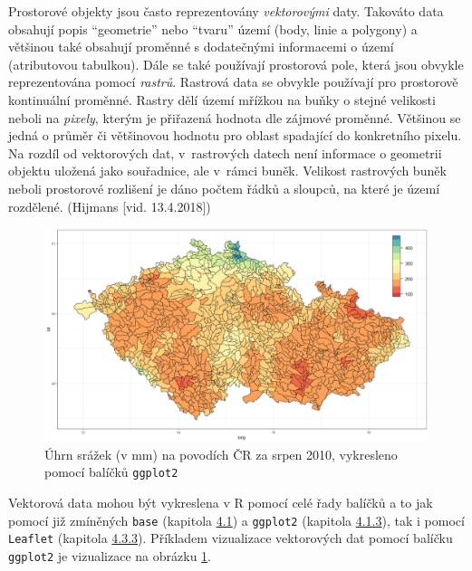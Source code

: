 \documentclass[12pt,]{article}
\begin{document}
\qquad Prostorové objekty jsou často reprezentovány \emph{vektorovými}
daty. Takováto data obsahují popis \enquote{geometrie} nebo
\enquote{tvaru} území (body, linie a polygony) a většinou také obsahují
proměnné s dodatečnými informacemi o území (atributovou tabulkou). Dále
se také používají prostorová pole, která jsou obvykle reprezentována
pomocí \emph{rastrů}. Rastrová data se obvykle používají pro prostorově
kontinuální proměnné. Rastry dělí území mřížkou na buňky o stejné
velikosti neboli na \emph{pixely}, kterým je přiřazená hodnota dle
zájmové proměnné. Většinou se jedná o průměr či většinovou hodnotu pro
oblast spadající do konkretního pixelu. Na rozdíl od vektorových dat,
v~rastrových datech není informace o geometrii objektu uložená jako
souřadnice, ale v~rámci buněk. Velikost rastrových buněk neboli
prostorové rozlišení je dáno počtem řádků a sloupců, na které je území
rozdělené. (Hijmans {[}vid. 13.4.2018{]})

\begin{figure}[H]
  \centering
      \includegraphics[width=\textwidth]{fig/ggplot_map2}
      \caption{Úhrn srážek (v mm) na povodích ČR za srpen 2010, vykresleno pomocí balíčků \texttt{ggplot2}}
      \label{fig:ch4.2}
\end{figure}

\qquad Vektorová data mohou být vykreslena v R pomocí celé řady balíčků
a to jak pomocí již zmíněných \texttt{base} (kapitola
\protect\hyperlink{baseviz}{4.1}) a \texttt{ggplot2} (kapitola
\protect\hyperlink{ggplot}{4.1.3}), tak i pomocí \texttt{Leaflet}
(kapitola \protect\hyperlink{leaflet}{4.3.3}). Příkladem vizualizace
vektorových dat pomocí balíčku \texttt{ggplot2} je vizualizace na
obrázku \ref{fig:ch4.2}.
\end{document}
